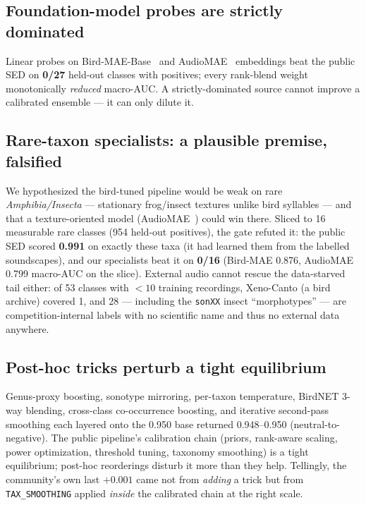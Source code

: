 \documentclass{ceurart}
\begin{document}
\subsection{Foundation-model probes are strictly dominated}
\label{sec:probes}

Linear probes on Bird-MAE-Base~\cite{birdmae} and AudioMAE~\cite{audiomae}
embeddings beat the public SED on \textbf{0/27} held-out classes with positives;
every rank-blend weight monotonically \emph{reduced} macro-AUC. A
strictly-dominated source cannot improve a calibrated ensemble --- it can only
dilute it.

\subsection{Rare-taxon specialists: a plausible premise, falsified}
\label{sec:raretaxa}

We hypothesized the bird-tuned pipeline would be weak on rare
\emph{Amphibia/Insecta} --- stationary frog/insect textures unlike bird syllables
--- and that a texture-oriented model (AudioMAE~\cite{audiomae}) could win there.
Sliced to 16 measurable rare classes (954 held-out positives), the gate refuted it:
the public SED scored \textbf{0.991} on exactly these taxa (it had learned them from
the labelled soundscapes), and our specialists beat it on \textbf{0/16}
(Bird-MAE 0.876, AudioMAE 0.799 macro-AUC on the slice). External audio cannot
rescue the data-starved tail either: of 53 classes with $<10$ training recordings,
Xeno-Canto (a bird archive) covered 1, and 28 --- including the \texttt{sonXX}
insect ``morphotypes'' --- are competition-internal labels with no scientific name
and thus no external data anywhere.

\subsection{Post-hoc tricks perturb a tight equilibrium}
\label{sec:posthoc}

Genus-proxy boosting, sonotype mirroring, per-taxon temperature, BirdNET 3-way
blending, cross-class co-occurrence boosting, and iterative second-pass smoothing
each layered onto the 0.950 base returned 0.948--0.950 (neutral-to-negative). The
public pipeline's calibration chain (priors, rank-aware scaling, power
optimization, threshold tuning, taxonomy smoothing) is a tight equilibrium;
post-hoc reorderings disturb it more than they help. Tellingly, the community's own
last $+0.001$ came not from \emph{adding} a trick but from \texttt{TAX\_SMOOTHING}
applied \emph{inside} the calibrated chain at the right scale.
\end{document}
